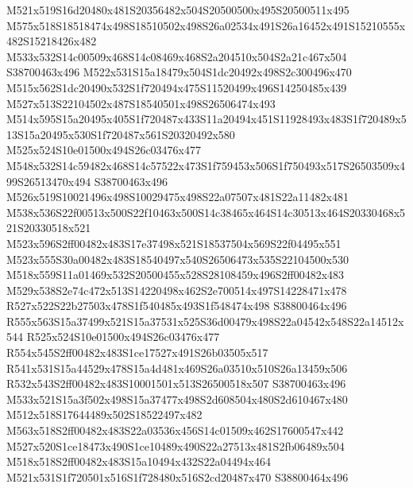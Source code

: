 \documentclass{article}
\begin{document}
\begin{multicols}{2}



M521x519S16d20480x481S20356482x504S20500500x495S20500511x495 M575x518S18518474x498S18510502x498S26a02534x491S26a16452x491S15210555x482S15218426x482 M533x532S14c00509x468S14c08469x468S2a204510x504S2a21c467x504 S38700463x496 M522x531S15a18479x504S1dc20492x498S2c300496x470 M515x562S1dc20490x532S1f720494x475S11520499x496S14250485x439 M527x513S22104502x487S18540501x498S26506474x493 M514x595S15a20495x405S1f720487x433S11a20494x451S11928493x483S1f720489x513S15a20495x530S1f720487x561S20320492x580 M525x524S10e01500x494S26c03476x477 M548x532S14c59482x468S14c57522x473S1f759453x506S1f750493x517S26503509x499S26513470x494 S38700463x496 M526x519S10021496x498S10029475x498S22a07507x481S22a11482x481 M538x536S22f00513x500S22f10463x500S14c38465x464S14c30513x464S20330468x521S20330518x521 M523x596S2ff00482x483S17e37498x521S18537504x569S22f04495x551 M523x555S30a00482x483S18540497x540S26506473x535S22104500x530 M518x559S11a01469x532S20500455x528S28108459x496S2ff00482x483 M529x538S2e74c472x513S14220498x462S2e700514x497S14228471x478 R527x522S22b27503x478S1f540485x493S1f548474x498 S38800464x496 R555x563S15a37499x521S15a37531x525S36d00479x498S22a04542x548S22a14512x544 R525x524S10e01500x494S26c03476x477 R554x545S2ff00482x483S1ce17527x491S26b03505x517 R541x531S15a44529x478S15a4d481x469S26a03510x510S26a13459x506 R532x543S2ff00482x483S10001501x513S26500518x507 S38700463x496 M533x521S15a3f502x498S15a37477x498S2d608504x480S2d610467x480 M512x518S17644489x502S18522497x482 M563x518S2ff00482x483S22a03536x456S14c01509x462S17600547x442 M527x520S1ce18473x490S1ce10489x490S22a27513x481S2fb06489x504 M518x518S2ff00482x483S15a10494x432S22a04494x464 M521x531S1f720501x516S1f728480x516S2cd20487x470 S38800464x496




\end{multicols}
\end{document}
